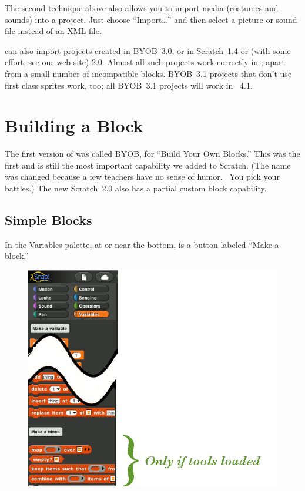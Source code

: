 \documentclass{report}
\begin{document}
The second technique above also allows you to import media (costumes and sounds) into a project. Just choose ``Import\ldots'' and then select a picture or sound file instead of an XML file.

\Snap{} can also import projects created in BYOB~3.0, or in Scratch~1.4 or (with some effort; see our web site) 2.0. Almost all such projects work correctly in \Snap{}, apart from a small number of incompatible blocks. BYOB~3.1 projects that don't use first class sprites work, too; all BYOB~3.1 projects will work in \Snap{}~4.1.

\chapter{Building a Block}

The first version of \Snap{} was called BYOB, for ``Build Your Own Blocks.'' This was the first and is still the most important capability we added to Scratch. (The name was changed because a few teachers have no sense of humor.~\frownie{} You pick your battles.) The new Scratch~2.0 also has a partial custom block capability.

\section{Simple Blocks}

In the Variables palette, at or near the bottom, is a button labeled ``Make a block.''\nopagebreak

\begin{figure}[H]
\centering
\includegraphics[scale=0.5]{variables-palette}
\end{figure}
\end{document}
